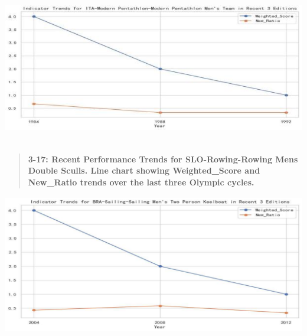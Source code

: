 \documentclass[12pt,a4paper]{article}
\renewenvironment{quote}{\begin{quotation}}{\end{quotation}}  %
\begin{document}
    \includegraphics[width=6.30167in,height=2.64833in]{./media/media/image26.jpeg}
    
    \begin{quote}
    \textbf{3-17: Recent Performance Trends for SLO-Rowing-Rowing
    Men\textquotesingle s Double Sculls. Line chart showing Weighted\_Score
    and New\_Ratio trends over the last three Olympic cycles.}
    \end{quote}
    
    \includegraphics[width=5.36333in,height=2.40666in]{./media/media/image27.png}
    
\end{document}
